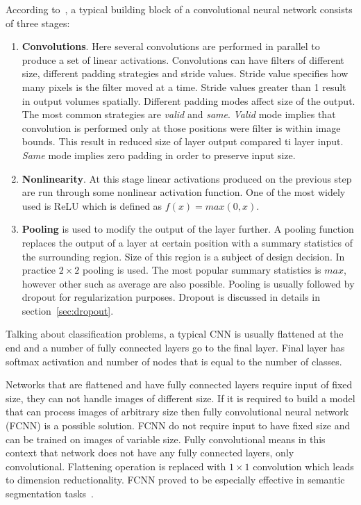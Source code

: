 \documentclass[a4paper, 11pt, table]{article}
\begin{document}
According to~\cite{dl_book}, a typical building block of a convolutional neural network consists of three stages:
\begin{enumerate}
\item \textbf{Convolutions}. Here several convolutions are performed in parallel to produce a set of linear activations. Convolutions can have filters of different size, different padding strategies and stride values. Stride value specifies how many pixels is the filter moved at a time. Stride values greater than 1 result in output volumes spatially. Different padding modes affect size of the output. The most common strategies are \textit{valid} and \textit{same}. \textit{Valid} mode implies that convolution is performed only at those positions were filter is within image bounds. This result in reduced size of layer output compared ti layer input. \textit{Same} mode implies zero padding in order to preserve input size. 

\item \textbf{Nonlinearity}. At this stage linear activations produced on the previous step are run through some nonlinear activation function. One of the most widely used is ReLU which is defined as $f(x) = max(0, x)$.
 
\item \textbf{Pooling} is used to modify the output of the layer further. A pooling function replaces the output of a layer at certain position with a summary statistics of the surrounding region. Size of this region is a subject of design decision. In practice $2 \times 2$ pooling is used. The most popular summary statistics is $max$, however other such as average are also possible. Pooling is usually followed by dropout for regularization purposes. Dropout is discussed in details in section~\ref{sec:dropout}.
\end{enumerate}

Talking about classification problems, a typical CNN is usually flattened at the end and a number of fully connected layers go to the final layer. Final layer has softmax activation and number of nodes that is equal to the number of classes. 

Networks that are flattened and have fully connected layers require input of fixed size, they can not handle images of different size. If it is required to build a model that can process images of arbitrary size then fully convolutional neural network (FCNN) is a possible solution. FCNN do not require input to have fixed size and can be trained on images of variable size. Fully convolutional means in this context that network does not have any fully connected layers, only convolutional. Flattening operation is replaced with $1 \times 1$ convolution which leads to dimension reductionality. FCNN proved to be especially effective in semantic segmentation tasks~\cite{DBLP:journals/corr/ShelhamerLD16}.
\end{document}
